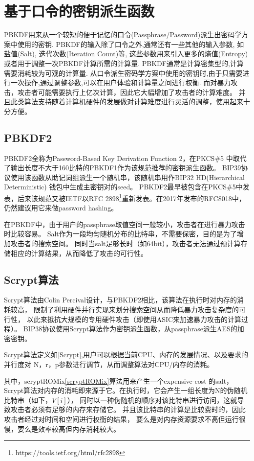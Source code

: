 
\section{基于口令的密钥派生函数}

PBKDF用来从一个较短的便于记忆的口令(Passphrase/Password)派生出密码学方案中使用的密钥.
PBKDF的输入除了口令之外,通常还有一些其他的输入参数, 如盐值(Salt), 迭代次数(Iteration Count)等,
这些参数用来引入更多的熵值(Entropy)或者用于调整一次PBKDF计算所需的计算量.
PBKDF通常是计算密集型的,计算需要消耗较为可观的计算量.
从口令派生密码学方案中使用的密钥时,由于只需要进行一次操作,通过调整参数,可以在用户体验和计算量之间进行权衡.
而对暴力攻击，攻击者可能需要执行上亿次计算，因此它大幅增加了攻击者的计算难度。
并且此类算法支持随着计算机硬件的发展做对计算难度进行灵活的调整，使用起来十分方便。

\subsection{PBKDF2}
PBKDF2全称为Password-Based Key Derivation Function 2，在PKCS\#5
中取代了输出长度不大于160比特的PBKDF1作为该规范推荐的密钥派生函数。
BIP39协议使用该函数从助记词组派生一个随机串，该随机串用作BIP32 HD(Hierarchical Deterministic)
钱包中生成主密钥对的seed。  PBKDF2最早被包含在PKCS\#5中发表，后来该规范又被IETF以RFC 
2898\footnote{https://tools.ietf.org/html/rfc2898}重新发表。在2017年发布的RFC8018中，仍然建议用它来做password hashing。

在PBKDF中，由于用户的passphrase取值空间一般较小，攻击者在进行暴力攻击时比较容易。
Salt作为一段均匀随机分布的比特串，不需要保密，目的是为了增加攻击者的搜索空间。
同时当salt足够长时（如64bit），攻击者无法通过预计算存储相应的计算结果，从而降低了攻击的可行性。

\subsection{Scrypt算法}
Scrypt算法由Colin Percival设计，与PBKDF2相比，该算法在执行时对内存的消耗较高，
限制了利用硬件并行实现来划分搜索空间从而降低暴力攻击复杂度的可行性，
以此来抵抗大规模的专用硬件攻击（即使用ASIC来加速暴力攻击的计算过程）。
BIP38协议使用Scrypt算法作为密钥派生函数，从passphrase派生AES的加密密钥。 
 
Scrypt算法定义如\ref{Scrypt},用户可以根据当前CPU、内存的发展情况、以及要求的并行度对
N，r，p参数进行调节，从而调整算法对CPU/内存的消耗。

其中，scryptROMix\ref{scryptROMix}算法用来产生一个expensive-cost 的salt，Scrypt算法对内存的消耗即来源于它。在执行时，它会产生一组长度为N的伪随机比特串（如下，$V[i]$），
同时以一种伪随机的顺序对该比特串进行访问，这就导致攻击者必须有足够的内存来存储它。
并且该比特串的计算是比较费时的，因此攻击者经过对时间和空间进行权衡的结果，
要么是对内存资源要求不高但运行很慢，要么是效率较高但内存消耗较大。

